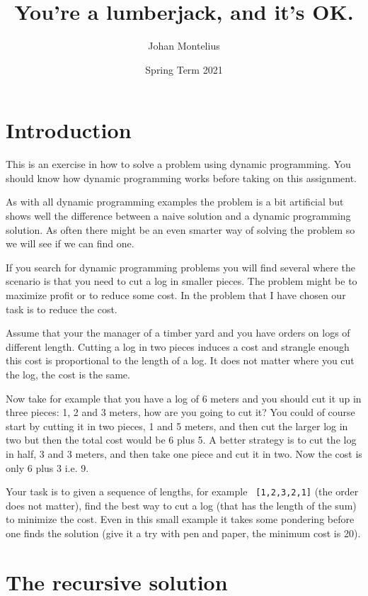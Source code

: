 \documentclass[a4paper,11pt]{article}
\begin{document}
\title{
    \textbf{You're a lumberjack, and it's OK.}
}
\author{Johan Montelius}
\date{Spring Term 2021}
\maketitle
{}

\section*{Introduction}

This is an exercise in how to solve a problem using dynamic
programming. You should know how dynamic programming works before
taking on this assignment.

As with all dynamic programming examples the problem is a bit
artificial but shows well the difference between a naive solution and
a dynamic programming solution. As often there might be an even
smarter way of solving the problem so we will see if we can find one.

If you search for dynamic programming problems you will find several
where the scenario is that you need to cut a log in smaller
pieces. The problem might be to maximize profit or to reduce some
cost. In the problem that I have chosen our task is to reduce the cost.

Assume that your the manager of a timber yard and you have orders on
logs of different length. Cutting a log in two pieces induces a cost
and strangle enough this cost is proportional to the length of a
log. It does not matter where you cut the log, the cost is the same.

Now take for example that you have a log of 6 meters and you should
cut it up in three pieces: 1, 2 and 3 meters, how are you going to cut
it? You could of course start by cutting it in two pieces, 1 and 5
meters, and then cut the larger log in two but then the total cost
would be 6 plus 5. A better strategy is to cut the log in half, 3 and 3
meters, and then take one piece and cut it in two. Now the
cost is only 6 plus 3 i.e. 9.

Your task is to given a sequence of lengths, for example {\tt
  [1,2,3,2,1]} (the order does not matter), find the best way to cut a
log (that has the length of the sum) to minimize the cost. Even in
this small example it takes some pondering before one finds the
solution (give it a try with pen and paper, the minimum cost is 20).


\section*{The recursive solution}
\end{document}
